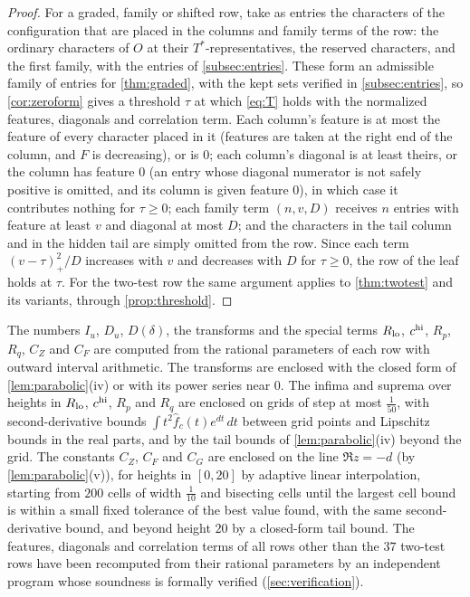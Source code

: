 \begin{proof}
For a graded, family or shifted row, take as entries the characters of the configuration that
are placed in the columns and family terms of the row: the ordinary characters of $O$ at their
$T^*$-representatives, the reserved characters, and the first family, with the entries of
\cref{subsec:entries}. These form an admissible family of entries for \cref{thm:graded}, with the
kept sets verified in \cref{subsec:entries}, so \cref{cor:zeroform} gives a threshold $\tau$ at
which \eqref{eq:T} holds with the normalized features, diagonals and correlation term. Each column's feature is
at most the feature of every character placed in it (features are taken at the right end of the
column, and $F$ is decreasing), or is $0$; each column's diagonal is at least theirs, or the column
has feature $0$ (an entry whose diagonal numerator is not safely positive is omitted, and its column
is given feature $0$), in which case it contributes nothing for $\tau\ge0$; each family
term $(n,v,D)$ receives $n$ entries with feature at least $v$ and diagonal at most $D$; and the
characters in the tail column and in the hidden tail are simply omitted from the row. Since each term $(v-\tau)_+^2/D$
increases with $v$ and decreases with $D$ for $\tau\ge0$, the row of the leaf holds at $\tau$. For the
two-test row the same argument applies to \cref{thm:twotest} and its variants, through
\cref{prop:threshold}.
\end{proof}

The numbers $I_u$, $D_u$, $D(\delta)$, the transforms and the special terms $R_{\mathrm{lo}}$, $c^{\mathrm{hi}}$, $R_p$, $R_q$,
$C_Z$ and $C_F$ are computed from the rational parameters of each row with outward interval arithmetic. The
transforms are enclosed with the closed form of \cref{lem:parabolic}(iv) or with its power series near
$0$. The infima and suprema over heights in $R_{\mathrm{lo}}$, $c^{\mathrm{hi}}$, $R_p$ and $R_q$ are enclosed on grids of step
at most $\frac1{50}$, with second-derivative bounds $\int t^2\hat f_c(t)e^{dt}\,dt$ between grid points and
Lipschitz bounds in the real parts, and by the tail bounds of \cref{lem:parabolic}(iv) beyond the
grid. The constants $C_Z$, $C_F$ and $C_G$ are enclosed on the line $\Re z=-d$ (by
\cref{lem:parabolic}(v)), for heights in $[0,20]$ by adaptive linear interpolation, starting from
$200$ cells of width $\frac1{10}$ and bisecting cells until the largest cell bound is within a small
fixed tolerance of the best value found, with the same second-derivative bound, and beyond height
$20$ by a closed-form tail bound. The features, diagonals and correlation terms of all rows other than the $37$ two-test rows have been
recomputed from their rational parameters by an independent program whose soundness is formally
verified (\cref{sec:verification}).
